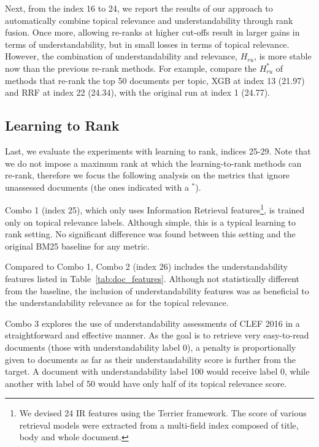 Next, from the index 16 to 24, we report the results of our approach to automatically combine topical relevance and understandability through rank fusion.
Once more, allowing re-ranks at higher cut-offs result in larger gains in terms of understandability, but in small losses in terms of topical relevance.
However, the combination of understandability and relevance, $H_{ru}$, is more stable now than the previous re-rank methods. 
For example, compare the $H_{ru}^*$ of methods that re-rank the top 50 documents per topic, XGB at index 13 (21.97) and RRF at index 22 (24.34), with the original run at index 1 (24.77).

\subsection{Learning to Rank}
\label{results:ltr}

Last, we evaluate the experiments with learning to rank, indices 25-29. Note that we do not impose a maximum rank at which the learning-to-rank methods can re-rank, therefore we focus the following analysis on the metrics that ignore unassessed documents (the ones indicated with a $^*$).

Combo 1 (index 25), which only uses Information Retrieval features\footnote{We devised 24 IR features using the Terrier framework. The score of various retrieval models were extracted from a multi-field index composed of title, body and whole document.}, is trained only on topical relevance labels. Although simple, this is a typical learning to rank setting.
No significant difference was found between this setting and the original BM25 baseline for any metric.

Compared to Combo 1, Combo 2 (index 26) includes the understandability features listed in Table~\ref{tab:doc_features}. Although not statistically different from the baseline, the inclusion of understandability features was as beneficial to the understandability relevance as for the topical relevance.

Combo 3 explores the use of understandability assessments of CLEF 2016 in a straightforward and effective manner. As the goal is to retrieve very easy-to-read documents (those with understandability label 0), a penalty is proportionally given to documents as far as their understandability score is further from the target. A document with understandability label 100 would receive label 0, while another with label of 50 would have only half of its topical relevance score.

